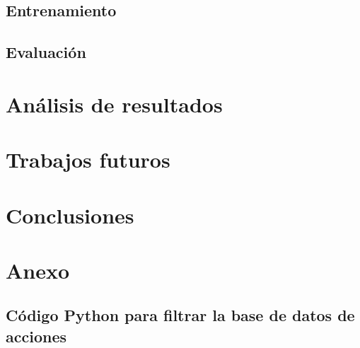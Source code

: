 \documentclass[12pt]{report} %
\begin{document}
    \section{Entrenamiento}

    \section{Evaluación}

    \chapter{Análisis de resultados}
    \label{chap:resultados}

    \chapter{Trabajos futuros}
    \label{chap:future}

    \chapter{Conclusiones}
    \label{chap:conclusion}



    \clearpage

    \label{chap:bibliography}
    \printbibliography


    \chapter*{Anexo}
    \label{anexo}

    \section*{Código Python para filtrar la base de datos de acciones}
    \label{filtrado_script}
    
\end{document}
